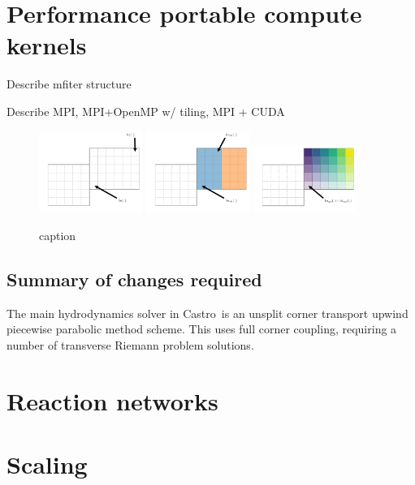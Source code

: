 \documentclass[twocolumn,times]{aastex62}
\newcommand{\castro}{{\sf Castro}}
\begin{document}
\section{Performance portable compute kernels}

Describe mfiter structure

Describe MPI, MPI+OpenMP w/ tiling, MPI + CUDA

\begin{figure}
\centering
\includegraphics[width=0.3\textwidth]{gpu_1} 
\includegraphics[width=0.3\textwidth]{gpu_2} 
\includegraphics[width=0.3\textwidth]{gpu_3}
\caption{\label{fig:loops} caption}
\end{figure}

\subsection{Summary of changes required}

The main hydrodynamics solver in \castro\ is an unsplit corner
transport upwind \citep{ppmunsplit} piecewise parabolic method
\citep{ppm} scheme.  This uses full corner coupling, requiring a 
number of transverse Riemann problem solutions.  

\section{Reaction networks}

\section{Scaling}
\end{document}
